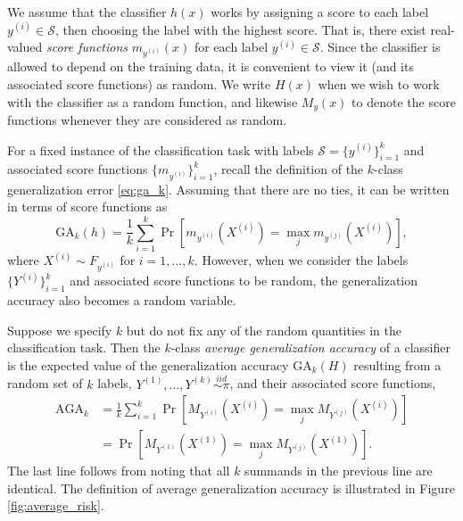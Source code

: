\documentclass[twoside,11pt]{article}
\begin{document}
We assume that the classifier $h(x)$ works by assigning a score to
each label $y^{(i)} \in \mathcal{S}$, then choosing the label with the
highest score.  That is, there exist real-valued \emph{score
  functions} $m_{y^{(i)}}(x)$ for each label $y^{(i)} \in
\mathcal{S}$.  Since the classifier is allowed to depend on the
training data, it is convenient to view it (and its associated score
functions) as random.  We write $H(x)$ when we wish to work with the
classifier as a random function, and likewise $M_y(x)$ to denote the
score functions whenever they are considered as random.

For a fixed instance of the classification task with labels
$\mathcal{S} = \{y^{(i)}\}_{i=1}^k$ and associated score functions
$\{m_{y^{(i)}}\}_{i=1}^k$, recall the definition of the $k$-class
generalization error \eqref{eq:ga_k}.  Assuming that there are no
ties, it can be written in terms of score functions as
\[
\text{GA}_k(h) = \frac{1}{k} \sum_{i=1}^k  \Pr[m_{y^{(i)}}(X^{(i)}) = \max_j
m_{y^{(j)}}(X^{(i)})],
\]
where $X^{(i)} \sim F_{y^{(i)}}$ for $i =1,\hdots, k$.  However, when
we consider the labels $\{Y^{(i)}\}_{i=1}^k$ and associated score
functions to be random, the generalization accuracy also becomes a
random variable.

Suppose we specify $k$ but do not fix any of the random quantities in
the classification task.  Then the $k$-class \emph{average
  generalization accuracy} of a classifier is the expected value of
the generalization accuracy $\text{GA}_k(H)$ resulting from a random
set of $k$ labels, $Y^{(1)}, \hdots, Y^{(k)} \stackrel{iid}{\sim
  \pi}$, and their associated score functions,
\begin{align*}
\text{AGA}_k &= \frac{1}{k} \sum_{i=1}^k \Pr[M_{Y^{(i)}}(X^{(i)}) = \max_j
M_{Y^{(j)}}(X^{(i)})]
\\&= \Pr[M_{Y^{(1)}}(X^{(1)}) = \max_j M_{Y^{(j)}}(X^{(1)})].
\end{align*}
The last line follows from noting that all $k$ summands in the
previous line are identical.  The definition of average
  generalization accuracy is illustrated in Figure
  \ref{fig:average_risk}.
\end{document}
